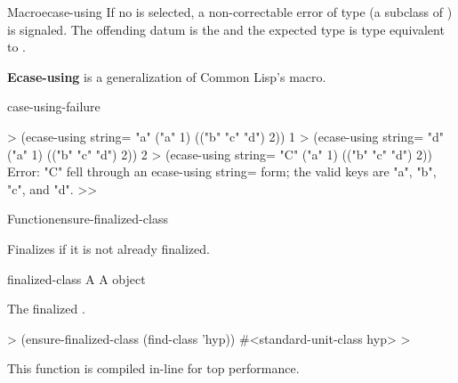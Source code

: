 \documentclass[10pt,twoside,english,pdftex]{article}
\newcommand{\inline}{This function is compiled in-line for top performance.}
\begin{document}
\begin{functiondoc}{Macro}{ecase-using}{%
    }
%
%
%
If no  is selected, a non-correctable error of type
 (a subclass of ) is
signaled. The offending datum is the  and the expected
type is type equivalent to .

\textbf{Ecase-using} is a generalization of Common Lisp's 
macro.

\begin{alsos}{case-using-failure}
\end{alsos}

\fnexamples
%
\W\supp
\begin{example}
  > (ecase-using string= "a"
      ("a" 1)
      (("b" "c" "d") 2))
  1
  > (ecase-using string= "d"
      ("a" 1)
      (("b" "c" "d") 2))
  2\goodpagebreak
  > (ecase-using string= "C"
      ("a" 1)
      (("b" "c" "d") 2))
  Error: "C" fell through an ecase-using string= form; 
         the valid keys are "a", "b", "c", and "d".
  >>\goodpagebreak
\end{example}

\end{functiondoc}


\begin{functiondoc}{Function}{ensure-finalized-class}{ 
    \returns{} }
%
%

\fnsyntax

\fnpurpose Finalizes  if it is not already finalized.

\fnpackage {}

\fnmodule {}

\fnargs
\begin{args}{finalized-class}
\arg[class] A 
 A  object
\end{args}

\fnreturns The finalized .

\fnexample
%
\W\supp
\begin{example}
  > (ensure-finalized-class (find-class 'hyp))
  #<standard-unit-class hyp>
  >
\end{example}

\fnnote \inline

\end{functiondoc}
\end{document}
